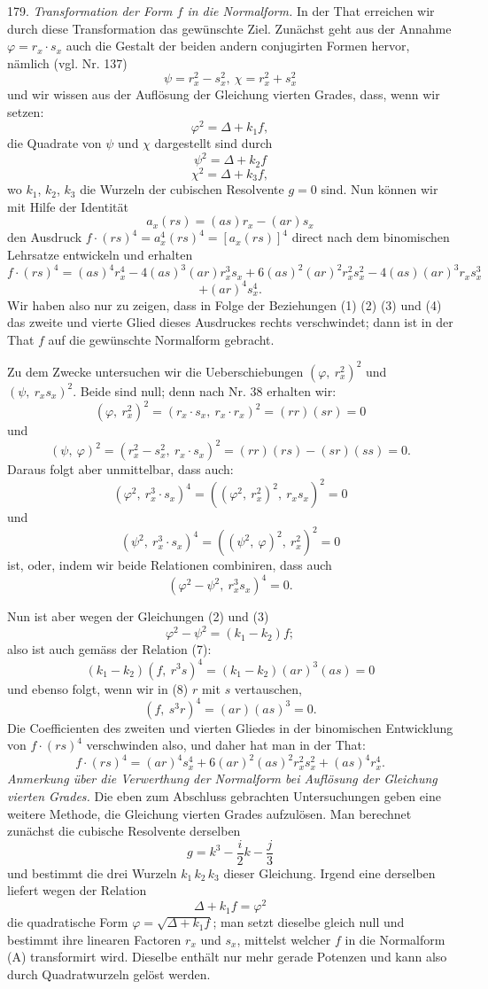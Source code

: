 \documentclass[11pt]{article}
\providecommand{\weberpage}[1]{}
\providecommand{\weq}[2]{\begin{equation}\tag{#1}#2\end{equation}}
\let\Delta\varDelta
\begin{document}
179. \textit{Transformation der Form $f$ in die Normalform.} In der That erreichen wir durch diese Transformation das gewünschte Ziel. Zunächst geht aus der Annahme $\varphi=r_x\cdot s_x$ auch die Gestalt der beiden andern conjugirten Formen hervor, nämlich (vgl. Nr. 137)
\weq{1}{\psi=r_x^2-s_x^2,\ \chi=r_x^2+s_x^2}
und wir wissen aus der Auflösung der Gleichung vierten Grades, dass, wenn wir setzen:
\weq{2}{\varphi^2=\Delta+k_1f,}
die Quadrate von $\psi$ und $\chi$ dargestellt sind durch
\weq{3}{\psi^2=\Delta+k_2f}
\weq{4}{\chi^2=\Delta+k_3f,}
wo $k_1$, $k_2$, $k_3$ die Wurzeln der cubischen Resolvente $g=0$ sind. Nun können wir mit Hilfe der Identität
\[
a_x(rs)=(as)r_x-(ar)s_x
\]
den Ausdruck $f\cdot(rs)^4=a_x^4(rs)^4=[a_x(rs)]^4$ direct nach dem binomischen Lehrsatze entwickeln und erhalten
\[
f\cdot(rs)^4=(as)^4r_x^4-4(as)^3(ar)r_x^3s_x+6(as)^2(ar)^2r_x^2s_x^2-4(as)(ar)^3r_xs_x^3
\]
\[
+(ar)^4s_x^4.
\]
Wir haben also nur zu zeigen, dass in Folge der Beziehungen (1) (2) (3) und (4) das zweite und vierte Glied dieses Ausdruckes rechts verschwindet; dann ist in der That $f$ auf die gewünschte Normalform gebracht.

Zu dem Zwecke untersuchen wir die Ueberschiebungen $(\varphi,\ r_x^2)^2$ und $(\psi,\ r_xs_x)^2$. Beide sind null; denn nach Nr. 38 erhalten wir:
\[
(\varphi,\ r_x^2)^2=(r_x\cdot s_x,\ r_x\cdot r_x)^2=(rr)(sr)=0
\]
und
\[
(\psi,\ \varphi)^2=(r_x^2-s_x^2,\ r_x\cdot s_x)^2=(rr)(rs)-(sr)(ss)=0.
\]
Daraus folgt aber unmittelbar, dass auch:
\weq{5}{(\varphi^2,\ r_x^3\cdot s_x)^4=((\varphi^2,\ r_x^2)^2,\ r_xs_x)^2=0}
und
\weq{6}{(\psi^2,\ r_x^3\cdot s_x)^4=((\psi^2,\ \varphi)^2,\ r_x^2)^2=0}
ist, oder, indem wir beide Relationen combiniren, dass auch
\weq{7}{(\varphi^2-\psi^2,\ r_x^3s_x)^4=0.}


\weberpage{200}
Nun ist aber wegen der Gleichungen (2) und (3)
\[
\varphi^2-\psi^2=(k_1-k_2)f;
\]
also ist auch gemäss der Relation (7):
\weq{8}{(k_1-k_2)(f,\ r^3s)^4=(k_1-k_2)(ar)^3(as)=0}
und ebenso folgt, wenn wir in (8) $r$ mit $s$ vertauschen,
\[
(f,\ s^3r)^4=(ar)(as)^3=0.
\]
Die Coefficienten des zweiten und vierten Gliedes in der binomischen Entwicklung von $f\cdot(rs)^4$ verschwinden also, und daher hat man in der That:
\weq{A}{f\cdot(rs)^4=(ar)^4s_x^4+6(ar)^2(as)^2r_x^2s_x^2+(as)^4r_x^4.}
\textit{Anmerkung über die Verwerthung der Normalform bei Auflösung der Gleichung vierten Grades.} Die eben zum Abschluss gebrachten Untersuchungen geben eine weitere Methode, die Gleichung vierten Grades aufzulösen. Man berechnet zunächst die cubische Resolvente derselben
\[
g=k^3-\frac{i}{2}k-\frac{j}{3}
\]
und bestimmt die drei Wurzeln $k_1\,k_2\,k_3$ dieser Gleichung. Irgend eine derselben liefert wegen der Relation
\[
\Delta+k_1f=\varphi^2
\]
die quadratische Form $\varphi=\sqrt{\Delta+k_1f}$; man setzt dieselbe gleich null und bestimmt ihre linearen Factoren $r_x$ und $s_x$, mittelst welcher $f$ in die Normalform (A) transformirt wird. Dieselbe enthält nur mehr gerade Potenzen und kann also durch Quadratwurzeln gelöst werden.
\end{document}
